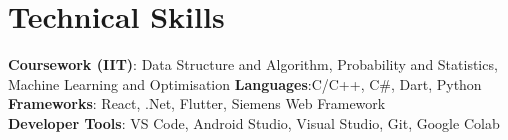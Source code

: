 \documentclass[letterpaper,11pt]{article}
\begin{document}
%
\section{Technical Skills}
 \begin{itemize}[leftmargin=0.15in, label={}]
    \small{\item{
    \textbf{Coursework (IIT)}{: Data Structure and Algorithm, Probability and Statistics, Machine Learning and Optimisation}
     \textbf{Languages}{:C/C++, C#, Dart, Python} \\
     \textbf{Frameworks}{: React, .Net, Flutter, Siemens Web Framework} \\
     \textbf{Developer Tools}{: VS Code, Android Studio, Visual Studio, Git, Google Colab} \\
    }}
 \end{itemize}


\end{document}
